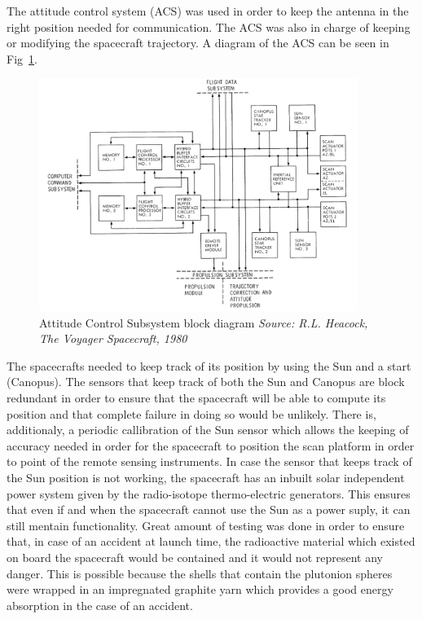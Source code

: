 The attitude control system (ACS) was used in order to keep
the antenna in the right position needed for communication. The ACS was also
in charge of keeping or modifying the spacecraft trajectory. A diagram of the
ACS can be seen in Fig~\ref{fig:voyager_bd}.

\begin{figure}[htb]
	\begin{center}
	\includegraphics[width=0.92\textwidth]{img/voyagerACS.png}
	\caption{Attitude Control Subsystem block diagram\small{\textit{ Source: R.L.
	Heacock, The Voyager Spacecraft, 1980}}}
	\label{fig:voyager_bd}
	\end{center}
\end{figure}

The spacecrafts needed to keep track of its position by using the Sun and a
start (Canopus). The sensors that keep track of both the Sun and Canopus are block
redundant in order to ensure that the spacecraft will be able to compute its
position and that complete failure in doing so would be unlikely. There is,
additionaly, a periodic callibration of the Sun sensor which allows the keeping
of accuracy needed in order for the spacecraft to position the scan platform in
order to point of the remote sensing instruments. In case the sensor that keeps
track of the Sun position is not working, the spacecraft has an inbuilt solar
independent power system given by the radio-isotope thermo-electric generators.
This ensures that even if and when the spacecraft cannot use the Sun as a power
suply, it can still mentain functionality. Great amount of testing was done in
order to ensure that, in case of an accident at launch time, the radioactive
material which existed on board the spacecraft would be contained and it would
not represent any danger. This is possible because the shells that contain the
plutonion spheres were wrapped in an impregnated graphite yarn which provides a
good energy absorption in the case of an accident.

